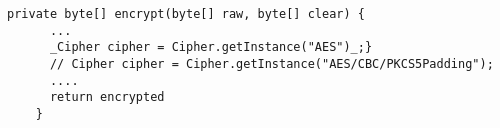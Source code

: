 \begin{lstlisting}[caption={A real code snippet taken from Stackoverflow. I want to build a tool which after analyzing the code snippet will highlight the part of the code that is insecure and suggest an alternative secure implementation as showed in the figure.}, label={fig:motivating-example}]
    private byte[] encrypt(byte[] raw, byte[] clear) {
      ...
      _Cipher cipher = Cipher.getInstance("AES")_;}
      // Cipher cipher = Cipher.getInstance("AES/CBC/PKCS5Padding");
      ....
      return encrypted
    }
     \end{lstlisting}